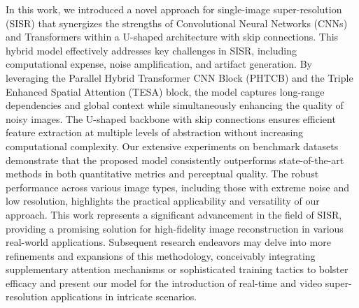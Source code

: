 \documentclass{ieeeaccess}
\begin{document}
In this work, we introduced a novel approach for single-image super-resolution (SISR) that synergizes the strengths of Convolutional Neural Networks (CNNs) and Transformers within a U-shaped architecture with skip connections. This hybrid model effectively addresses key challenges in SISR, including computational expense, noise amplification, and artifact generation. By leveraging the Parallel Hybrid Transformer CNN Block (PHTCB) and the Triple Enhanced Spatial Attention (TESA) block, the model captures long-range dependencies and global context while simultaneously enhancing the quality of noisy images. The U-shaped backbone with skip connections ensures efficient feature extraction at multiple levels of abstraction without increasing computational complexity. Our extensive experiments on benchmark datasets demonstrate that the proposed model consistently outperforms state-of-the-art methods in both quantitative metrics and perceptual quality. The robust performance across various image types, including those with extreme noise and low resolution, highlights the practical applicability and versatility of our approach. This work represents a significant advancement in the field of SISR, providing a promising solution for high-fidelity image reconstruction in various real-world applications. Subsequent research endeavors may delve into more refinements and expansions of this methodology, conceivably integrating supplementary attention mechanisms or sophisticated training tactics to bolster efficacy and present our model for the introduction of real-time and video super-resolution applications in intricate scenarios.
\end{document}
